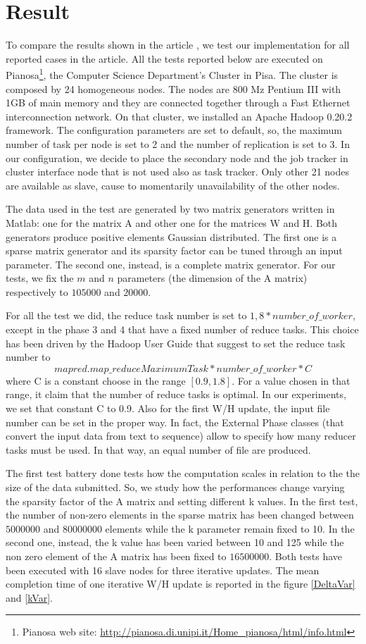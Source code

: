 \section{Result}
\label{result}

To compare the results shown in the article \cite{liu2010}, we test our implementation for all reported cases in the article. All the tests reported below are executed on Pianosa\footnote{Pianosa web site: \url{http://pianosa.di.unipi.it/Home_pianosa/html/info.html}}, the Computer Science Department's Cluster in Pisa. The cluster is composed by 24 homogeneous nodes. The nodes are 800 Mz Pentium III with 1GB of main memory and they are connected together through a Fast Ethernet interconnection network. On that cluster, we installed an Apache Hadoop 0.20.2 framework. The configuration parameters are set to default, so, the maximum number of task per node is set to 2 and the number of replication is set to 3. In our configuration, we decide to place the secondary node and the job tracker in cluster interface node that is not used also as task tracker. Only other 21 nodes are available as slave, cause to momentarily unavailability of the other nodes.

The data used in the test are generated by two matrix generators written in Matlab: one for the matrix A and other one for the matrices W and H. Both generators produce positive elements Gaussian distributed. The first one is a sparse matrix generator and its sparsity factor can be tuned through an input parameter. The second one, instead, is a complete matrix generator. For our tests, we fix the $m$ and $n$ parameters (the dimension of the A matrix) respectively to $105000$ and $20000$.

For all the test we did, the reduce task number is set to $ 1,8 * number\_of\_worker$, except in the phase 3 and 4 that have a fixed number of reduce tasks. This choice has been driven by the Hadoop User Guide that suggest to set the reduce task number to $$ mapred.map\_reduceMaximumTask * number\_of\_worker * C $$ where C is a constant choose in the range $[ 0.9, 1.8]$. For a value chosen in that range, it claim that the number of reduce tasks is optimal. In our experiments, we set that constant C to 0.9. Also for the first  W/H update, the input file number can be set in the proper way. In fact, the External Phase classes (that convert the input data from text to sequence) allow to specify how many reducer tasks must be used. In that way, an equal number of file are produced.

The first test battery done tests how the computation scales in relation to the the size of the data submitted. So, we study how the performances change varying the sparsity factor of the A matrix and setting different k values. In the first test, the number of non-zero elements in the sparse matrix has been changed between $5000000$ and $80000000$ elements while the k parameter remain fixed to 10. In the second one, instead, the k value has been varied between 10 and 125 while the non zero element of the A matrix has been fixed to $16500000$.  Both tests have been executed with 16 slave nodes for three iterative updates. The mean completion time of one iterative W/H update is reported in the figure \ref{DeltaVar}  and \ref{kVar}. 


